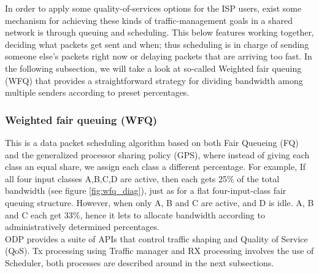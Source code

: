 In order to apply some quality-of-services options for the ISP users, exist some mechanism for achieving these kinds of traffic-management goals in a shared network is through queuing and scheduling. This below features working together, deciding what packets get sent and when; thus scheduling is in charge of sending someone else’s packets right now or delaying packets that are arriving too fast.
In the following subsection, we will take a look at so-called Weighted fair queuing (WFQ) that provides a straightforward strategy for dividing bandwidth among multiple senders according to preset percentages.


\subsubsection{Weighted fair queuing (WFQ)} 






This is a data packet scheduling algorithm based on both Fair Queueing (FQ) and the generalized processor sharing policy (GPS), where instead of giving each class an equal share, we assign each class a different percentage. For example, If all four input classes A,B,C,D are active, then each gets 25\% of the total bandwidth (see figure \ref{fig:wfq_diag}), just as for a flat four-input-class fair queuing structure. However, when only A, B and C are active, and D is idle.  A, B and C each get 33\%, hence it lets to allocate bandwidth according to administratively determined percentages.\\ 
ODP provides a suite of APIs that control traffic shaping and Quality of Service (QoS). Tx processing using Traffic manager and RX processing involves the use of Scheduler, both processes are described around in the next subsections.


